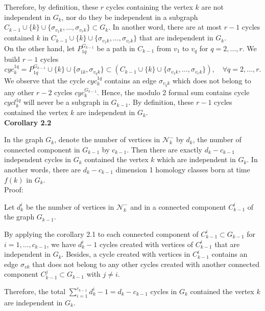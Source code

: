 \documentclass[a4paper,12pt]{article}
\numberwithin{equation}{section}
\begin{document}
	Therefore, by definition, these $r$ cycles containing the vertex $k$ are not independent in $G_k$, nor do they be independent in a subgraph $C_{k-1} \cup \{k\} \cup \{ \sigma_{v_1k},\ldots, \sigma_{v_rk}\} \subset G_k$. In another word, there are at most $r-1$ cycles contained $k$ in $C_{k-1} \cup \{k\} \cup \{ \sigma_{v_1k},\ldots, \sigma_{v_rk}\}$ that are independent in $G_k$.\\
	
	On the other hand, let $P_{1q}^{G_{k-1}}$ be a path in $C_{k-1}$ from $v_1$ to $v_q$ for $q=2,\ldots,r$. We build $r-1$ cycles 
	$$cyc_{k}^{1q}= P_{1q}^{G_{k-1}} \cup \{k\} \cup \{\sigma_{1k}, \sigma_{v_qk} \} \subset \left( C_{k-1} \cup \{k\} \cup \{ \sigma_{v_1k},\ldots, \sigma_{v_rk}\} \right), \quad \forall q = 2,\ldots,r.$$
	We observe that the cycle $cyc_k^{1q}$ contains an edge $\sigma_{v_qk}$ which does not belong to any other $r-2$ cycles $cyc_{k}^{G_{k-1}}$. Hence, the modulo 2 formal sum contains cycle $cycl_k^{1q}$ will never be a subgraph in $G_{k-1}$. By definition, these $r-1$ cycles contained the vertex $k$ are independent in $G_k$. \\
	
	
	\noindent \textbf{Corollary 2.2}
	
	In the graph $G_k$, denote the number of vertices in $\mathcal{N}_k^-$ by $d_k$, the number of connected component in $G_{k-1}$ by $c_{k-1}$. Then there are exactly $d_k - c_{k-1}$ independent cycles in $G_k$ contained the vertex $k$ which are independent in $G_k$. In another words, there are $d_k - c_{k-1}$ dimension 1 homology classes born at time $f(k)$ in $G_k$.\\
	
	\noindent Proof:
	
	Let $d_k^i$ be the number of vertices in $\mathcal{N}_k^-$ and in a connected component $C^i_{k-1}$ of the graph $G_{k-1}$.
	
	By applying the corollary 2.1 to each connected component of $C_{k-1}^i \subset G_{k-1}$ for $i = 1,\ldots,c_{k-1}$, we have $d_k^i -1$ cycles created with vertices of $C_{k-1}^i$ that are independent in $G_k$. Besides, a cycle created with vertices in $C_{k-1}^i$ contains an edge $\sigma_{vk}$ that does not belong to any other cycles created with another connected component $C_{k-1}^j \subset G_{k-1}$ with $j\neq i$. 
	
	Therefore, the total $\sum_{i=1}^{c_{k-1}} d^i_k -1 = d_k - c_{k-1}$ cycles in $G_k$ contained the vertex $k$ are independent in $G_k$. \\
	
\end{document}
